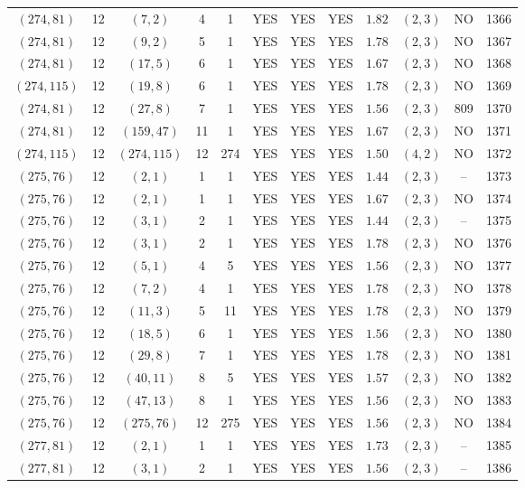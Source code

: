 \begin{longtable}{|c|c|c|c|c|c|c|c|c|c|c|c|}
$(274,81)$ & 12 & $(7,2)$ & 4 & 1 & YES & YES & YES & $1.82$ & $(2,3)$ & NO & 1366\\
$(274,81)$ & 12 & $(9,2)$ & 5 & 1 & YES & YES & YES & $1.78$ & $(2,3)$ & NO & 1367\\
$(274,81)$ & 12 & $(17,5)$ & 6 & 1 & YES & YES & YES & $1.67$ & $(2,3)$ & NO & 1368\\
$(274,115)$ & 12 & $(19,8)$ & 6 & 1 & YES & YES & YES & $1.78$ & $(2,3)$ & NO & 1369\\
$(274,81)$ & 12 & $(27,8)$ & 7 & 1 & YES & YES & YES & $1.56$ & $(2,3)$ & 809 & 1370\\
$(274,81)$ & 12 & $(159,47)$ & 11 & 1 & YES & YES & YES & $1.67$ & $(2,3)$ & NO & 1371\\
$(274,115)$ & 12 & $(274,115)$ & 12 & 274 & YES & YES & YES & $1.50$ & $(4,2)$ & NO & 1372\\
$(275,76)$ & 12 & $(2,1)$ & 1 & 1 & YES & YES & YES & $1.44$ & $(2,3)$ & -- & 1373\\
$(275,76)$ & 12 & $(2,1)$ & 1 & 1 & YES & YES & YES & $1.67$ & $(2,3)$ & NO & 1374\\
$(275,76)$ & 12 & $(3,1)$ & 2 & 1 & YES & YES & YES & $1.44$ & $(2,3)$ & -- & 1375\\
$(275,76)$ & 12 & $(3,1)$ & 2 & 1 & YES & YES & YES & $1.78$ & $(2,3)$ & NO & 1376\\
$(275,76)$ & 12 & $(5,1)$ & 4 & 5 & YES & YES & YES & $1.56$ & $(2,3)$ & NO & 1377\\
$(275,76)$ & 12 & $(7,2)$ & 4 & 1 & YES & YES & YES & $1.78$ & $(2,3)$ & NO & 1378\\
$(275,76)$ & 12 & $(11,3)$ & 5 & 11 & YES & YES & YES & $1.78$ & $(2,3)$ & NO & 1379\\
$(275,76)$ & 12 & $(18,5)$ & 6 & 1 & YES & YES & YES & $1.56$ & $(2,3)$ & NO & 1380\\
$(275,76)$ & 12 & $(29,8)$ & 7 & 1 & YES & YES & YES & $1.78$ & $(2,3)$ & NO & 1381\\
$(275,76)$ & 12 & $(40,11)$ & 8 & 5 & YES & YES & YES & $1.57$ & $(2,3)$ & NO & 1382\\
$(275,76)$ & 12 & $(47,13)$ & 8 & 1 & YES & YES & YES & $1.56$ & $(2,3)$ & NO & 1383\\
$(275,76)$ & 12 & $(275,76)$ & 12 & 275 & YES & YES & YES & $1.56$ & $(2,3)$ & NO & 1384\\
$(277,81)$ & 12 & $(2,1)$ & 1 & 1 & YES & YES & YES & $1.73$ & $(2,3)$ & -- & 1385\\
$(277,81)$ & 12 & $(3,1)$ & 2 & 1 & YES & YES & YES & $1.56$ & $(2,3)$ & -- & 1386\\

\end{longtable}
